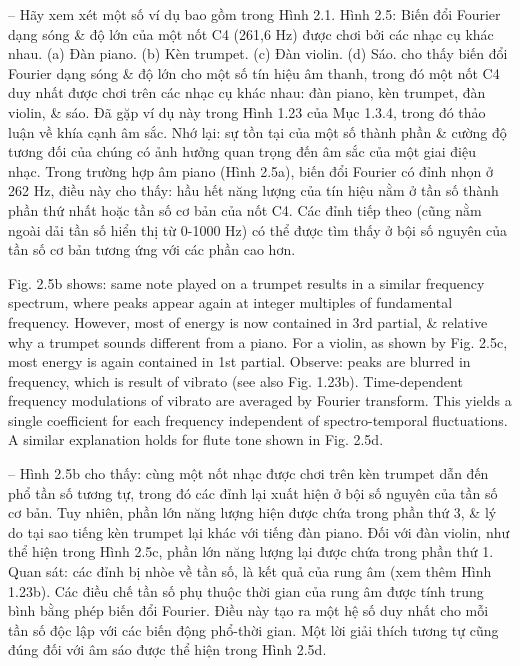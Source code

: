\documentclass{article}
\begin{document}
\begin{itemize}
\begin{itemize}
\begin{itemize}
			-- Hãy xem xét một số ví dụ bao gồm trong {\sf Hình 2.1}. {\sf Hình 2.5: Biến đổi Fourier dạng sóng \& độ lớn của một nốt C4 (261,6 Hz) được chơi bởi các nhạc cụ khác nhau. (a) Đàn piano. (b) Kèn trumpet. (c) Đàn violin. (d) Sáo.} cho thấy biến đổi Fourier dạng sóng \& độ lớn cho một số tín hiệu âm thanh, trong đó một nốt C4 duy nhất được chơi trên các nhạc cụ khác nhau: đàn piano, kèn trumpet, đàn violin, \& sáo. Đã gặp ví dụ này trong {\sf Hình 1.23} của Mục 1.3.4, trong đó thảo luận về khía cạnh âm sắc. Nhớ lại: sự tồn tại của một số thành phần \& cường độ tương đối của chúng có ảnh hưởng quan trọng đến âm sắc của một giai điệu nhạc. Trong trường hợp âm piano ({\sf Hình 2.5a}), biến đổi Fourier có đỉnh nhọn ở 262 Hz, điều này cho thấy: hầu hết năng lượng của tín hiệu nằm ở tần số thành phần thứ nhất hoặc tần số cơ bản của nốt C4. Các đỉnh tiếp theo (cũng nằm ngoài dải tần số hiển thị từ 0-1000 Hz) có thể được tìm thấy ở bội số nguyên của tần số cơ bản tương ứng với các phần cao hơn.
			
			{\sf Fig. 2.5b} shows: same note played on a trumpet results in a similar frequency spectrum, where peaks appear again at integer multiples of fundamental frequency. However, most of energy is now contained in 3rd partial, \& relative why a trumpet sounds different from a piano. For a violin, as shown by {\sf Fig. 2.5c}, most energy is again contained in 1st partial. Observe: peaks are blurred in frequency, which is result of vibrato (see also {\sf Fig. 1.23b}). Time-dependent frequency modulations of vibrato are averaged by Fourier transform. This yields a single coefficient for each frequency independent of spectro-temporal fluctuations. A similar explanation holds for flute tone shown in {\sf Fig. 2.5d}.
			
			-- {\sf Hình 2.5b} cho thấy: cùng một nốt nhạc được chơi trên kèn trumpet dẫn đến phổ tần số tương tự, trong đó các đỉnh lại xuất hiện ở bội số nguyên của tần số cơ bản. Tuy nhiên, phần lớn năng lượng hiện được chứa trong phần thứ 3, \& lý do tại sao tiếng kèn trumpet lại khác với tiếng đàn piano. Đối với đàn violin, như thể hiện trong {\sf Hình 2.5c}, phần lớn năng lượng lại được chứa trong phần thứ 1. Quan sát: các đỉnh bị nhòe về tần số, là kết quả của rung âm (xem thêm {\sf Hình 1.23b}). Các điều chế tần số phụ thuộc thời gian của rung âm được tính trung bình bằng phép biến đổi Fourier. Điều này tạo ra một hệ số duy nhất cho mỗi tần số độc lập với các biến động phổ-thời gian. Một lời giải thích tương tự cũng đúng đối với âm sáo được thể hiện trong {\sf Hình 2.5d}.
						

\end{itemize}
\end{itemize}
\end{itemize}
\end{document}
